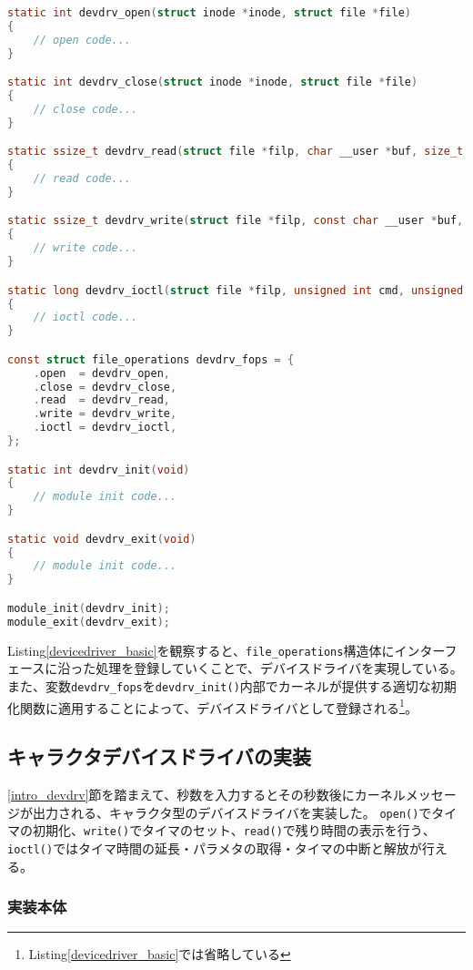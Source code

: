 \documentclass[main]{subfiles}
\begin{document}
\begin{lstlisting}[label=devicedriver_basic,caption=デバイスドライバの骨組み,language=c]
static int devdrv_open(struct inode *inode, struct file *file)
{
    // open code...
}

static int devdrv_close(struct inode *inode, struct file *file)
{
    // close code...
}

static ssize_t devdrv_read(struct file *filp, char __user *buf, size_t count, loff_t *offset)
{
    // read code...
}

static ssize_t devdrv_write(struct file *filp, const char __user *buf, size_t count, loff_t *offset)
{
    // write code...
}

static long devdrv_ioctl(struct file *filp, unsigned int cmd, unsigned long arg)
{
    // ioctl code...
}

const struct file_operations devdrv_fops = {
    .open  = devdrv_open,
    .close = devdrv_close,
    .read  = devdrv_read,
    .write = devdrv_write,
    .ioctl = devdrv_ioctl,
};

static int devdrv_init(void)
{
    // module init code...
}

static void devdrv_exit(void)
{
    // module init code...
}

module_init(devdrv_init);
module_exit(devdrv_exit);
\end{lstlisting}

Listing\ref{devicedriver_basic}を観察すると、\texttt{file\_operations}構造体にインターフェースに沿った処理を登録していくことで、デバイスドライバを実現している。
また、変数\texttt{devdrv\_fops}を\texttt{devdrv\_init()}内部でカーネルが提供する適切な初期化関数に適用することによって、デバイスドライバとして登録される\footnote{Listing\ref{devicedriver_basic}では省略している}。

\subsection{キャラクタデバイスドライバの実装}

\ref{intro_devdrv}節を踏まえて、秒数を入力するとその秒数後にカーネルメッセージが出力される、キャラクタ型のデバイスドライバを実装した。
\texttt{open()}でタイマの初期化、\texttt{write()}でタイマのセット、\texttt{read()}で残り時間の表示を行う、\texttt{ioctl()}ではタイマ時間の延長・パラメタの取得・タイマの中断と解放が行える。

\subsubsection{実装本体}
\end{document}

